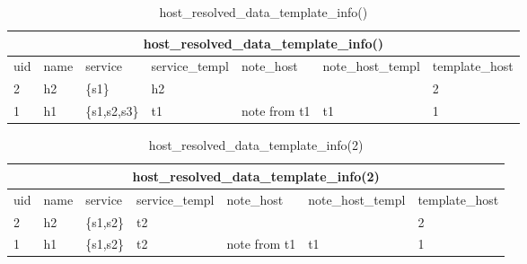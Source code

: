 \documentclass[deska]{subfiles}
\begin{document}
\begin{center}

\begin{table}
    \caption{host\_resolved\_data\_template\_info()}
    \label{tab-multi-reshost}
\begin{tabular}{ | l | l | l | l | l | l | l | }
    \hline
    \multicolumn{7}{|c|}{host\_resolved\_data\_template\_info()}\\
    \hline
    uid &  name &  service &  service\_templ &  note\_host &  note\_host\_templ &  template\_host\\
    \hline
    2 & h2 & \{s1\} & h2 &  &  & 2\\
    1 & h1 & \{s1,s2,s3\} & t1 & note from t1 & t1 & 1\\
    \hline
\end{tabular}
\end{table}

\begin{table}
    \caption{host\_resolved\_data\_template\_info(2)}
    \label{tab-multi-reshostv2}
\begin{tabular}{ | l | l | l | l | l | l | l | }
    \hline
    \multicolumn{7}{|c|}{host\_resolved\_data\_template\_info(2)}\\
    \hline
    uid &  name &  service &  service\_templ &  note\_host &  note\_host\_templ &  template\_host\\
    \hline
    2 & h2 & \{s1,s2\} & t2 &  &  & 2\\
    1 & h1 & \{s1,s2\} & t2 & note from t1 & t1 & 1\\
    \hline
\end{tabular}
\end{table}


\end{center}
\end{document}

